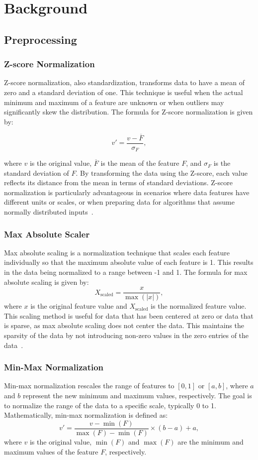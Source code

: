 \section{Background}\label{sec:background}
\subsection{Preprocessing}

\subsubsection{Z-score Normalization}
Z-score normalization, also standardization, transforms data to have a mean of zero and a standard deviation of one.
This technique is useful when the actual minimum and maximum of a feature are unknown or when outliers may significantly skew the distribution.
The formula for Z-score normalization is given by:

$$
v' = \frac{v - \overline{F}}{\sigma_F},
$$

where $v$ is the original value, $\overline{F}$ is the mean of the feature $F$, and $\sigma_F$ is the standard deviation of $F$.
By transforming the data using the Z-score, each value reflects its distance from the mean in terms of standard deviations.
Z-score normalization is particularly advantageous in scenarios where data features have different units or scales, or when preparing data for algorithms that assume normally distributed inputs~\cite{dataminingConcepts}.

\subsubsection{Max Absolute Scaler}
Max absolute scaling is a normalization technique that scales each feature individually so that the maximum absolute value of each feature is 1.
This results in the data being normalized to a range between -1 and 1.
The formula for max absolute scaling is given by:
$$
	X_{\text{scaled}} = \frac{x}{\max(|x|)},
$$
where $x$ is the original feature value and $X_{\text{scaled}}$ is the normalized feature value.
This scaling method is useful for data that has been centered at zero or data that is sparse, as max absolute scaling does not center the data.
This maintains the sparsity of the data by not introducing non-zero values in the zero entries of the data~\cite{Vasques2024}.


\subsubsection{Min-Max Normalization}\label{subsec:min-max}
Min-max normalization rescales the range of features to $[0, 1]$ or $[a, b]$, where $a$ and $b$ represent the new minimum and maximum values, respectively.
The goal is to normalize the range of the data to a specific scale, typically 0 to 1.
Mathematically, min-max normalization is defined as:
$$
	v' = \frac{v - \min(F)}{\max(F) - \min(F)} \times (b - a) + a,
$$
where $v$ is the original value, $\min(F)$ and $\max(F)$ are the minimum and maximum values of the feature $F$, respectively.

